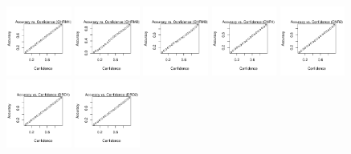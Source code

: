 \documentclass[utf8]{frontiersSCNS} %
\begin{document}
\begin{figure}[h!]
\includegraphics[width=0.19\textwidth]{figures/calibration_plots/chrm1_calib.pdf}
\includegraphics[width=0.19\textwidth]{figures/calibration_plots/chrm2_calib.pdf}
\includegraphics[width=0.19\textwidth]{figures/calibration_plots/chrm3_calib.pdf}
\includegraphics[width=0.19\textwidth]{figures/calibration_plots/cnr1_calib.pdf}
\includegraphics[width=0.19\textwidth]{figures/calibration_plots/cnr2_calib.pdf}
\includegraphics[width=0.19\textwidth]{figures/calibration_plots/drd1_calib.pdf}
\includegraphics[width=0.19\textwidth]{figures/calibration_plots/drd2_calib.pdf}

\end{figure}
\end{document}
